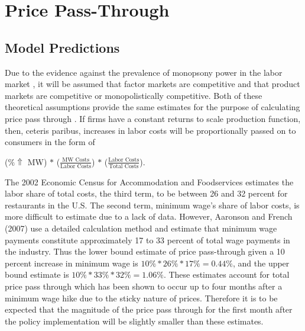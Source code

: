 \documentclass[11pt]{article}
\begin{document}
\section{Price Pass-Through}


\subsection{Model Predictions}
Due to the evidence against the prevalence of monopsony power in the labor market \cite{manning1995we, rebitzer1995consequences, burdett1998wage, bhaskar1999minimum, aaronson2008minimum}, it will be assumed that factor markets are competitive and that product markets are competitive or monopolistically competitive. Both of these theoretical assumptions provide the same estimates for the purpose of calculating price pass through \cite{aaronson2008minimum}. If firms have a constant returns to scale production function, then, ceteris paribus, increases in labor costs will be proportionally passed on to consumers in the form of 
\begin{center}
\centering ($\% \Uparrow$ MW) $*$  \small($\frac{\mbox{MW Costs}}{\mbox{Labor Costs}}$)  $*$  ($\frac{\mbox{Labor Costs}}{\mbox{Total Costs}}$). 
\end{center}
\noindent The 2002 Economic Census for Accommodation and Foodservices  estimates the labor share of total costs, the third term, to be between 26 and 32 percent for restaurants in the U.S\nocite{census}. The second term, minimum wage's share of labor costs, is more difficult to estimate due to a lack of data. However, Aaronson and French (2007) use a detailed calculation method and estimate that minimum wage payments constitute approximately 17 to 33 percent of total wage payments in the industry\nocite{aaronson2007product}. Thus the lower bound estimate of price pass-through given a 10 percent increase in minimum wage is $10\% * 26\% * 17\% = 0.44\%$, and the upper bound estimate is $10\% * 33\% * 32\% = 1.06\%$. These estimates account for total price pass through which has been shown to occur up to four months after a minimum wage hike due to the sticky nature of prices. Therefore it is to be expected that the magnitude of the price pass through for the first month after the policy implementation will be slightly smaller than these estimates.
\end{document}

